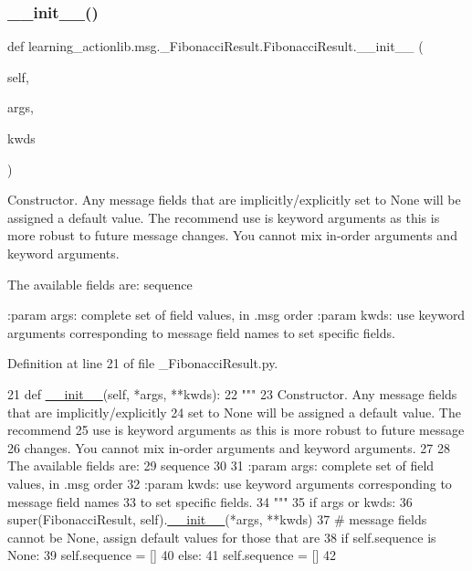 \subsubsection{\texorpdfstring{\+\_\+\+\_\+init\+\_\+\+\_\+()}{\_\_init\_\_()}}
{\footnotesize\ttfamily def learning\+\_\+actionlib.\+msg.\+\_\+\+Fibonacci\+Result.\+Fibonacci\+Result.\+\_\+\+\_\+init\+\_\+\+\_\+ (\begin{DoxyParamCaption}\item[{}]{self,  }\item[{}]{args,  }\item[{}]{kwds }\end{DoxyParamCaption})}

\begin{DoxyVerb}Constructor. Any message fields that are implicitly/explicitly
set to None will be assigned a default value. The recommend
use is keyword arguments as this is more robust to future message
changes.  You cannot mix in-order arguments and keyword arguments.

The available fields are:
   sequence

:param args: complete set of field values, in .msg order
:param kwds: use keyword arguments corresponding to message field names
to set specific fields.
\end{DoxyVerb}
 

Definition at line 21 of file \+\_\+\+Fibonacci\+Result.\+py.


\begin{DoxyCode}
21   \textcolor{keyword}{def }\hyperlink{classstate__machine_1_1Play_a5993a23d8be7f7b2647f71ede0334957}{\_\_init\_\_}(self, *args, **kwds):
22     \textcolor{stringliteral}{"""}
23 \textcolor{stringliteral}{    Constructor. Any message fields that are implicitly/explicitly}
24 \textcolor{stringliteral}{    set to None will be assigned a default value. The recommend}
25 \textcolor{stringliteral}{    use is keyword arguments as this is more robust to future message}
26 \textcolor{stringliteral}{    changes.  You cannot mix in-order arguments and keyword arguments.}
27 \textcolor{stringliteral}{}
28 \textcolor{stringliteral}{    The available fields are:}
29 \textcolor{stringliteral}{       sequence}
30 \textcolor{stringliteral}{}
31 \textcolor{stringliteral}{    :param args: complete set of field values, in .msg order}
32 \textcolor{stringliteral}{    :param kwds: use keyword arguments corresponding to message field names}
33 \textcolor{stringliteral}{    to set specific fields.}
34 \textcolor{stringliteral}{    """}
35     \textcolor{keywordflow}{if} args \textcolor{keywordflow}{or} kwds:
36       super(FibonacciResult, self).\hyperlink{classstate__machine_1_1Play_a5993a23d8be7f7b2647f71ede0334957}{\_\_init\_\_}(*args, **kwds)
37       \textcolor{comment}{# message fields cannot be None, assign default values for those that are}
38       \textcolor{keywordflow}{if} self.sequence \textcolor{keywordflow}{is} \textcolor{keywordtype}{None}:
39         self.sequence = []
40     \textcolor{keywordflow}{else}:
41       self.sequence = []
42 
\end{DoxyCode}


